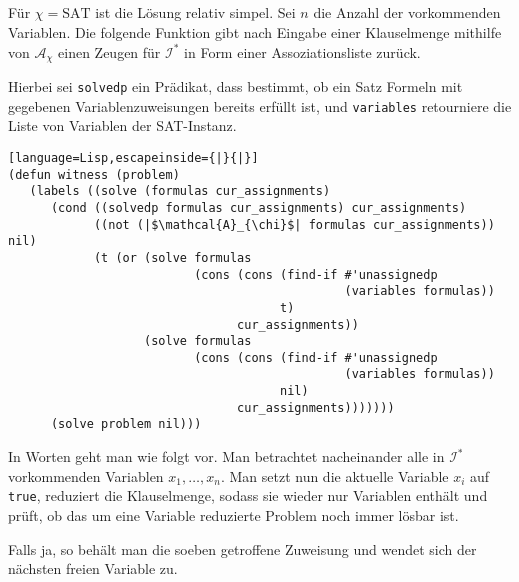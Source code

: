 \documentclass{article}
\begin{document}

\subsection{} 
\subsection{} 

Für $\chi = \text{SAT}$ ist die Lösung relativ simpel. Sei $n$ die Anzahl der
vorkommenden Variablen. Die folgende Funktion gibt nach Eingabe einer
Klauselmenge mithilfe von $\mathcal{A}_\chi$ einen Zeugen für $\mathcal{I}^*$ in
Form einer Assoziationsliste zurück.

Hierbei sei \texttt{solvedp} ein Prädikat, dass bestimmt, ob ein Satz Formeln
mit gegebenen Variablenzuweisungen bereits erfüllt ist, und \texttt{variables}
retourniere die Liste von Variablen der SAT-Instanz.

\begin{lstlisting}[language=Lisp,escapeinside={|}{|}]
(defun witness (problem)
   (labels ((solve (formulas cur_assignments)
      (cond ((solvedp formulas cur_assignments) cur_assignments)
            ((not (|$\mathcal{A}_{\chi}$| formulas cur_assignments)) nil)
            (t (or (solve formulas 
                          (cons (cons (find-if #'unassignedp 
                                               (variables formulas))
                                      t) 
                                cur_assignments))
                   (solve formulas 
                          (cons (cons (find-if #'unassignedp 
                                               (variables formulas)) 
                                      nil) 
                                cur_assignments)))))))
      (solve problem nil)))
\end{lstlisting}

In Worten geht man wie folgt vor. Man betrachtet nacheinander alle in
$\mathcal{I}^*$ vorkommenden Variablen $x_1,\ldots,x_n$. Man setzt nun die
aktuelle Variable $x_i$ auf \texttt{true}, reduziert die Klauselmenge, sodass sie
wieder nur Variablen enthält und prüft, ob das um eine Variable reduzierte
Problem noch immer lösbar ist. 

Falls ja, so behält man die soeben getroffene
Zuweisung und wendet sich der nächsten freien Variable zu. 
\end{document}

